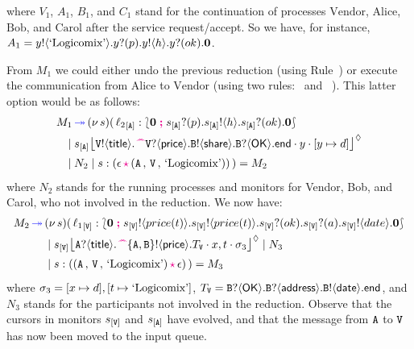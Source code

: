 \documentclass[runningheads,plain]{llncs}
\begin{document}
where 
$V_1$, $A_1$, $B_1$, and $C_1$ 
stand for the continuation of processes $\text{Vendor}$, $\text{Alice}$, $\text{Bob}$, and $\text{Carol}$ after the service 
request/accept. So we have, for instance, 
$
A_1 = y ! \langle \text{`Logicomix'} \rangle .y ? (p) .y ! \langle h \rangle .y ? (ok) .\mathbf{0}
$.

From $M_1$ we could either undo the previous reduction (using Rule~)
or execute the communication from $\text{Alice}$ to $\text{Vendor}$ (using two rules:~ and ~). This latter option would be as follows:
\begin{align*}
M_1 & \fw  \news{s}(\,  \np{\key{{\loc_2}}{\pA}}{ \conf{\inact}{\binp{\epA}{p}\bout{\epA}{h}\binp{\epA}{ok}\inact}} 
\\
& \!\!\!\!\Par 
\hmoni{\ep{s}{\pA}}{\ltout{\pS}{\mathsf{title}}{\past \ltinp{\pS}{\mathsf{price}}{\ltout{B}{\mathsf{share}}{\ltinp{B}{\mathsf{OK}}{\lend}}}}}{y}{\upd{y}{d}} 
\\
& \!\!\!\!\Par N_2 \Par \codah{s}{\emp}{\valueq{\pA}{\pS}{\exBook}}{}~)  = M_2
\end{align*}
where $N_2$ stands for the running processes and monitors for Vendor, Bob, and Carol, who not involved in the reduction.
We now have:
\begin{align*}
M_2 \textcolor{blue}{\,\twoheadrightarrow\,} & (\nu\, s)(\,  {{\ell_1}}_{[\mathtt{V}]}: \lbag \mathbf{0} \; \textcolor{magenta}{\textbf{;}}\; s_{[\mathtt{V}]} ! \langle price(t) \rangle . s_{[\mathtt{V}]} ! \langle price(t) \rangle .s_{[\mathtt{V}]} ? (ok) .  s_{[\mathtt{V}]} ? (a) . s_{[\mathtt{V}]} ! \langle date \rangle .\mathbf{0}  \rbag 
\\
& \;|\; 
{s_{[\mathtt{V}]}\mbox{{\large $\lfloor$}} \textcolor{black}{\mathtt{A}?\langle\mathsf{title}\rangle.\,\textcolor{magenta}{\text{\textbf{\textasciicircum\!\!\textasciicircum}}} \mathtt{\{A,B\}}!\langle\mathsf{price}\rangle.T_\mathtt{V}}\cdot x,t\cdot \sigma_3 \mbox{{\large $\rfloor$}}^{\lozenge}}  \;|\; N_3
\\
&  \;|\; s:((\mathtt{A} \,,\, \mathtt{V} \,,\,\text{`Logicomix'})\,\textcolor{magenta}{\mathbf{\star}}\,\epsilon)\!~)  = M_3
\end{align*}
where 
$\sigma_3  = [x\mapsto d],[t\mapsto \text{`Logicomix'}]$,
$T_\mathsf{\mathtt{V}}  = \mathtt{B}?\langle\mathsf{OK}\rangle.\mathtt{B}?\langle\mathsf{address}\rangle.\mathtt{B}!\langle\mathsf{date}\rangle.\mathsf{end}$,
and $N_3$ stands for the participants not involved in the reduction.
Observe that the cursors in monitors $s_{[\mathtt{V}]}$ and $s_{[\mathtt{A}]}$ have evolved, and that the message from $\mathtt{A}$ to $\mathtt{V}$ has now been moved to the input queue.
\end{document}
